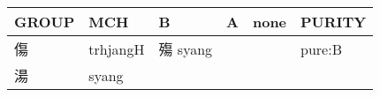 \documentclass[14pt,a4paper]{scrartcl}
\begin{document}
\begin{longtable}[c]{@{}llllll@{}}
\toprule
\begin{minipage}[b]{0.14\columnwidth}\raggedright\strut
GROUP
\strut\end{minipage} &
\begin{minipage}[b]{0.14\columnwidth}\raggedright\strut
MCH
\strut\end{minipage} &
\begin{minipage}[b]{0.14\columnwidth}\raggedright\strut
B
\strut\end{minipage} &
\begin{minipage}[b]{0.14\columnwidth}\raggedright\strut
A
\strut\end{minipage} &
\begin{minipage}[b]{0.14\columnwidth}\raggedright\strut
none
\strut\end{minipage} &
\begin{minipage}[b]{0.14\columnwidth}\raggedright\strut
PURITY
\strut\end{minipage}\tabularnewline
\midrule
\endhead
\begin{minipage}[t]{0.14\columnwidth}\raggedright\strut
傷
\strut\end{minipage} &
\begin{minipage}[t]{0.14\columnwidth}\raggedright\strut
trhjangH
\strut\end{minipage} &
\begin{minipage}[t]{0.14\columnwidth}\raggedright\strut
殤 syang
\strut\end{minipage} &
\begin{minipage}[t]{0.14\columnwidth}\raggedright\strut
\strut\end{minipage} &
\begin{minipage}[t]{0.14\columnwidth}\raggedright\strut
\strut\end{minipage} &
\begin{minipage}[t]{0.14\columnwidth}\raggedright\strut
pure:B
\strut\end{minipage}\tabularnewline
\begin{minipage}[t]{0.14\columnwidth}\raggedright\strut
湯
\strut\end{minipage} &
\begin{minipage}[t]{0.14\columnwidth}\raggedright\strut
syang
\strut\end{minipage} &
\begin{minipage}[t]{0.14\columnwidth}\raggedright\strut
\strut\end{minipage} &
\begin{minipage}[t]{0.14\columnwidth}\raggedright\strut

\end{minipage}
\end{longtable}
\end{document}
